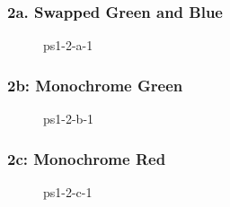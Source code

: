 \documentclass[../report.tex]{subfiles}
\begin{document}
    
    \begin{frame}
        \frametitle{2a. Swapped Green and Blue}
        \begin{figure}[!htb]
            \centering
            \caption{ps1-2-a-1}
        \end{figure}
    \end{frame}

    \begin{frame}
        \frametitle{2b: Monochrome Green}
        \begin{figure}[!htb]
            \centering
            \caption{ps1-2-b-1}
        \end{figure}
    \end{frame}

    \begin{frame}
        \frametitle{2c: Monochrome Red}
        \begin{figure}[!htb]
            \centering
            \caption{ps1-2-c-1}
        \end{figure}
    \end{frame}
    
\end{document}
